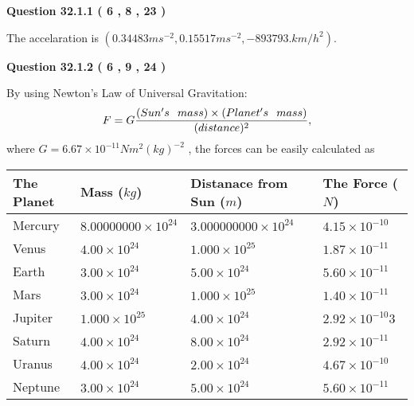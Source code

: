 \documentclass[12pt]{article}
\begin{document}
\vspace{0.2in}
  
{\textbf{\Large{Question
32.1.1 
 (           6 ,           8 ,          23 )
}}}
  
  
 
 
\noindent{}
 
 
The accelaration is
$(
0.34483ms^{-2},
0.15517ms^{-2},
-893793.km/h^2
).
$
 
 
 
 
  
\vspace{0.2in}
  
{\textbf{\Large{Question
32.1.2 
 (           6 ,           9 ,          24 )
}}}
  
  
 
 
\noindent{}

By using Newton's Law of Universal Gravitation:
\[
F=G \frac{(Sun's \hspace{0.1in} mass) \times (Planet's \hspace{0.1in} mass)} { (distance)^2},
\]
where
$ G= %
6.67 \times 10^{-11} N m^{2}(kg)^{-2}$ , the forces can be easily calculated as
 
\vspace{0.2in}
 
 
\begin{tabular}{|l|l|l|l|}
\hline
The Planet & Mass ($kg$) & Distanace from Sun ($m$) & The Force ($N$)\\
\hline
Mercury  &
           $ %
8.00000000 \times 10^{24}  $   &
             $ %
3.000000000 \times 10^{24}$    & $ %
4.15 \times 10^{-10} $
\\  \hline
Venus    &
           $  %
4.00 \times 10^{24}  $     &
             $ %
1.000 \times 10^{25} $    & $ %
1.87 \times 10^{-11} $
\\  \hline
Earth    &
           $  %
3.00 \times 10^{24}$     &
             $ %
5.00 \times 10^{24} $    & $ %
5.60 \times 10^{-11} $
\\   \hline
Mars     &
           $  %
3.00 \times 10^{24} $     &
             $ %
1.000 \times 10^{25}$    & $ %
1.40 \times 10^{-11} $
\\   \hline
Jupiter  &
           $  %
1.000 \times 10^{25}  $    &
             $ %
4.00 \times 10^{24} $    & $ %
2.92 \times 10^{-10}3 $
\\  \hline
Saturn   &
           $  %
4.00 \times 10^{24}   $    &
             $ %
8.00 \times 10^{24}  $    & $ %
2.92 \times 10^{-11} $
\\  \hline
Uranus   &
           $  %
4.00 \times 10^{24} $    &
             $ %
2.00 \times 10^{24}$    & $ %
4.67 \times 10^{-10} $
\\  \hline
Neptune  &
           $  %
3.00 \times 10^{24}  $    &
             $ %
5.00 \times 10^{24} $    & $ %
5.60 \times 10^{-11} $
\\  \hline
 
\end{tabular}
 
\end{document}
